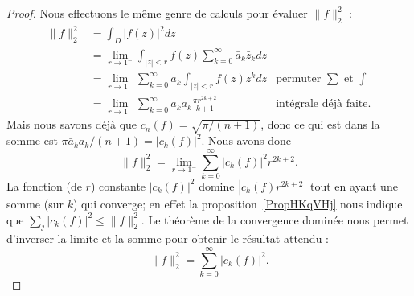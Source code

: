 \begin{proof}
	Nous effectuons le même genre de calculs pour évaluer \( \| f \|^2_2\) :
	\begin{subequations}
		\begin{align}
			\| f \|_2^2 & =\int_D| f(z) |^2dz                                                                                                \\
			            & =\lim_{r\to 1^-}\int_{| z |<r}f(z)\sum_{k=0}^{\infty}\bar a_k\bar z_kdz                                            \\
			            & =\lim_{r\to 1^-}\sum_{k=0}^{\infty}\bar a_k\int_{| z |<r}f(z)\bar z^kdz    & \text{permuter } \sum\text{ et } \int \\
			            & =\lim_{r\to 1^-}\sum_{k=0}^{\infty}\bar a_ka_k\frac{ \pi r^{2k+2} }{ k+1 } & \text{intégrale déjà faite}.
		\end{align}
	\end{subequations}
	Mais nous savons déjà que \( c_n(f)=\sqrt{\pi/(n+1)}\), donc ce qui est dans la somme est \( \pi\bar a_ka_k/(n+1)=| c_k(f) |^2\). Nous avons donc
	\begin{equation}
		\| f \|^2_2=\lim_{r\to 1^-}\sum_{k=0}^{\infty}| c_k(f) |^2 r^{2k+2}.
	\end{equation}
	La fonction (de \( r\)) constante \( | c_k(f) |^2\) domine \( | c_k(f)r^{2k+2} |\) tout en ayant une somme (sur \( k\)) qui converge; en effet la proposition~\ref{PropHKqVHj} nous indique que \( \sum_j| c_k(f) |^2\leq \| f \|_2^2\). Le théorème de la convergence dominée nous permet d'inverser la limite et la somme pour obtenir le résultat attendu :
	\begin{equation}
		\| f \|_2^2=\sum_{k=0}^{\infty}| c_k(f) |^2.
	\end{equation}
\end{proof}
